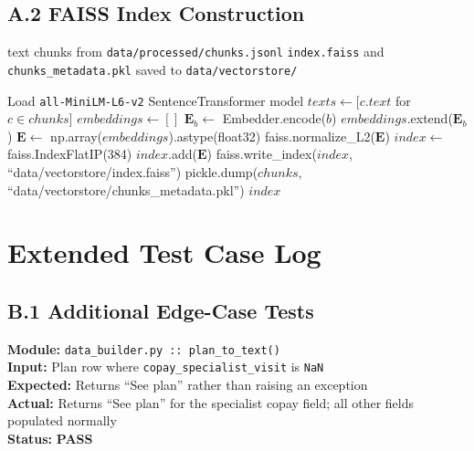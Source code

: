 \documentclass[12pt, letterpaper]{article}
\newenvironment{pseudoblock}[1]{%
  \begin{mdframed}[
    backgroundcolor=pseudobg,
    linecolor=pseudoframe,
    linewidth=1.5pt,
    frametitle={\color{pseudoframe}\bfseries\small Pseudo-code: #1},
    frametitlebackgroundcolor=pseudoframe!15
  ]
  \begin{algorithmic}[1]
}{%
  \end{algorithmic}
  \end{mdframed}
}
\newenvironment{testblock}[1]{%
  \begin{mdframed}[
    backgroundcolor=testbg,
    linecolor=testframe,
    linewidth=1.5pt,
    frametitle={\color{testframe}\bfseries\small Test Case: #1},
    frametitlebackgroundcolor=testframe!15
  ]
}{%
  \end{mdframed}
}
\begin{document}
\subsection*{A.2 \quad FAISS Index Construction}

\begin{pseudoblock}{FAISS Index Build --- \texttt{rag/embeddings.py::build\_index()}}
 text chunks from \texttt{data/processed/chunks.jsonl}
\ENSURE \texttt{index.faiss} and \texttt{chunks\_metadata.pkl} saved to \texttt{data/vectorstore/}

\STATE Load \texttt{all-MiniLM-L6-v2} SentenceTransformer model
\STATE $texts \gets [c.text$ for $c \in chunks]$
\STATE $embeddings \gets []$
    \STATE $\mathbf{E}_b \gets$ Embedder.encode($b$)
    \STATE $embeddings$.extend($\mathbf{E}_b$)
\ENDFOR
\STATE $\mathbf{E} \gets$ np.array($embeddings$).astype(float32)
\STATE faiss.normalize\_L2($\mathbf{E}$)   
\STATE $index \gets$ faiss.IndexFlatIP(384)
\STATE $index$.add($\mathbf{E}$)
\STATE faiss.write\_index($index$, ``data/vectorstore/index.faiss'')
\STATE pickle.dump($chunks$, ``data/vectorstore/chunks\_metadata.pkl'')
\RETURN $index$
\end{pseudoblock}

\section{Extended Test Case Log}
\label{app:testcases}

\subsection*{B.1 \quad Additional Edge-Case Tests}

\begin{testblock}{UT-E01 --- plan\_to\_text handles NaN copay values gracefully}
\textbf{Module:} \texttt{data\_builder.py :: plan\_to\_text()}\\
\textbf{Input:} Plan row where \texttt{copay\_specialist\_visit} is \texttt{NaN}\\
\textbf{Expected:} Returns ``See plan'' rather than raising an exception\\
\textbf{Actual:} Returns ``See plan'' for the specialist copay field; all other fields populated normally\\
\textbf{Status:} \textcolor{commentgreen}{\textbf{PASS}}
\end{testblock}
\end{document}
